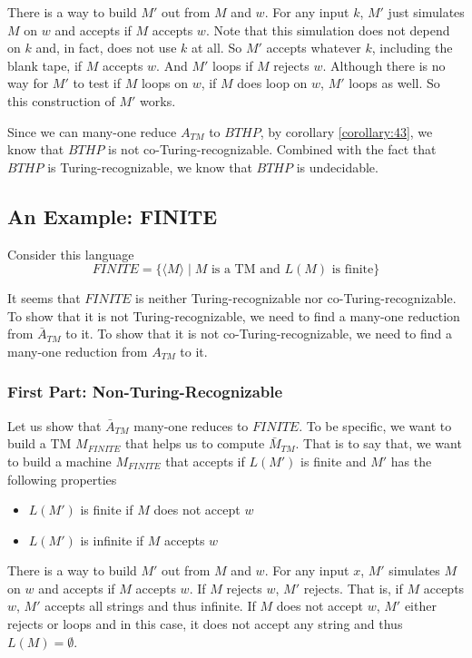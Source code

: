 \documentclass[11pt]{article}
\begin{document}
There is a way to build $M'$ out from $M$ and $w$. For any input $k$, $M'$ just simulates $M$ on $w$
and accepts if $M$ accepts $w$. Note that this simulation does not depend on $k$ and, in fact, does
not use $k$ at all. So $M'$ accepts whatever $k$, including the blank tape, if $M$ accepts $w$. And
$M'$ loops if $M$ rejects $w$. Although there is no way for $M'$ to test if $M$ loops on $w$, if
$M$ does loop on $w$, $M'$ loops as well. So this construction of $M'$ works.

Since we can many-one reduce $A_{TM}$ to $BTHP$, by corollary \ref{corollary:43}, we know that
$BTHP$ is not co-Turing-recognizable. Combined with the fact that $BTHP$ is Turing-recognizable,
we know that $BTHP$ is undecidable.

\subsection{An Example: FINITE}

Consider this language
\[
  FINITE = \{\langle M \rangle \mid M \text{ is a TM and } L(M) \text{ is finite}\}
\]

It seems that $FINITE$ is neither Turing-recognizable nor co-Turing-recognizable. To show that it is
not Turing-recognizable, we need to find a many-one reduction from $\bar{A}_{TM}$ to it. To show
that it is not co-Turing-recognizable, we need to find a many-one reduction from $A_{TM}$ to it.

\subsubsection{First Part: Non-Turing-Recognizable}

Let us show that $\bar{A}_{TM}$ many-one reduces to $FINITE$. To be specific, we want to build a TM
$M_{FINITE}$ that helps us to compute $\bar{M}_{TM}$. That is to say that, we want to build a
machine $M_{FINITE}$ that accepts if $L(M')$ is finite and $M'$ has the following properties
\begin{itemize}
\item $L(M')$ is finite if $M$ does not accept $w$
\item $L(M')$ is infinite if $M$ accepts $w$
\end{itemize}

There is a way to build $M'$ out from $M$ and $w$. For any input $x$, $M'$ simulates $M$ on $w$ and
accepts if $M$ accepts $w$. If $M$ rejects $w$, $M'$ rejects. That is, if $M$ accepts $w$, $M'$
accepts all strings and thus infinite. If $M$ does not accept $w$, $M'$ either rejects or loops and
in this case, it does not accept any string and thus $L(M) = \emptyset$.
\end{document}
